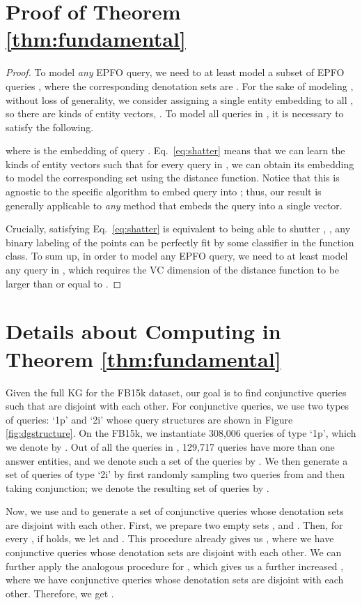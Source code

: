 
\section{Proof of Theorem \ref{thm:fundamental}}
\label{app:proof_fundamental}


\begin{proof}
To model \emph{any} EPFO query, we need to at least model a subset of EPFO queries
, where the corresponding denotation sets are .
For the sake of modeling , without loss of generality, we consider assigning a single entity embedding  to all , so there are  kinds of entity vectors, .
To model all queries in , it is necessary to satisfy the following.

where  is the embedding of query . 
Eq.~\ref{eq:shatter} means that we can learn the  kinds of entity vectors such that for every query in , we can obtain its embedding to model the corresponding set using the distance function.
Notice that this is agnostic to the specific algorithm to embed query  into ; thus, our result is generally applicable to \emph{any} method that embeds the query into a single vector.

Crucially, satisfying Eq.~\ref{eq:shatter} is equivalent to  being able to shutter , \ie, any binary labeling of the points can be perfectly fit by some classifier in the function class. To sum up, in order to model any EPFO query, we need to at least model any query in , which requires the VC dimension of the distance function to be larger than or equal to .
\end{proof}

\section{Details about Computing  in Theorem \ref{thm:fundamental}}
\label{app:calculate_m}
Given the full KG  for the FB15k dataset, our goal is to find conjunctive queries  such that  are disjoint with each other.
For conjunctive queries, we use two types of queries: `1p' and `2i' whose query structures are shown in Figure \ref{fig:dgstructure}. 
On the FB15k, we instantiate 308,006 queries of type `1p', which we denote by . Out of all the queries in , 129,717 queries have more than one answer entities, and we denote such a set of the queries by .
We then generate a set of queries of type `2i' by first randomly sampling two queries from  and then taking conjunction; we denote the resulting set of queries by .

Now, we use  and  to generate a set of conjunctive queries whose denotation sets are disjoint with each other.
First, we prepare two empty sets , and . 
Then, for every , if  holds, we let  and . This procedure already gives us , where we have  conjunctive queries whose denotation sets are disjoint with each other.
We can further apply the analogous procedure for , which gives us a further increased , where we have  conjunctive queries whose denotation sets are disjoint with each other. Therefore, we get .

